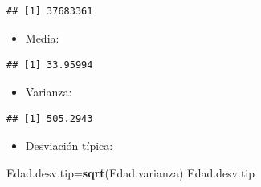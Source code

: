 \documentclass[]{book}
\newenvironment{Shaded}{\begin{snugshade}}{\end{snugshade}}
\newcommand{\DecValTok}[1]{\textcolor[rgb]{0.00,0.00,0.81}{#1}}
\newcommand{\KeywordTok}[1]{\textcolor[rgb]{0.13,0.29,0.53}{\textbf{#1}}}
\newcommand{\NormalTok}[1]{#1}
\newcommand{\OperatorTok}[1]{\textcolor[rgb]{0.81,0.36,0.00}{\textbf{#1}}}
\providecommand{\tightlist}{%
  \setlength{\itemsep}{0pt}\setlength{\parskip}{0pt}}
\theoremstyle{definition}
\theoremstyle{definition}
\theoremstyle{definition}
\theoremstyle{remark}
\begin{document}
\begin{Shaded}
\end{Shaded}

\begin{verbatim}
## [1] 37683361
\end{verbatim}

\begin{itemize}
\tightlist
\item
  Media:
\end{itemize}

\begin{Shaded}
\end{Shaded}

\begin{verbatim}
## [1] 33.95994
\end{verbatim}

\begin{itemize}
\tightlist
\item
  Varianza:
\end{itemize}

\begin{Shaded}
\end{Shaded}

\begin{verbatim}
## [1] 505.2943
\end{verbatim}

\begin{itemize}
\tightlist
\item
  Desviación típica:
\end{itemize}

\begin{Shaded}
\begin{Highlighting}[]
\NormalTok{Edad.desv.tip=}\KeywordTok{sqrt}\NormalTok{(Edad.varianza)  }
\NormalTok{Edad.desv.tip}
\end{Highlighting}
\end{Shaded}
\end{document}

